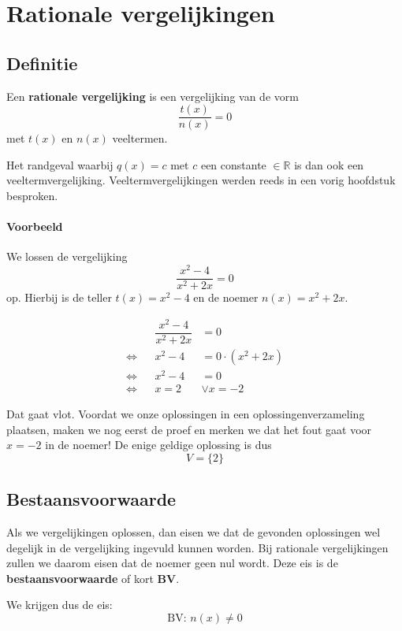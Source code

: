 \documentclass[a4paper,12pt]{article}
\begin{document}
\section{Rationale vergelijkingen}

\subsection{Definitie}

\begin{mdframed}
Een {\bf rationale vergelijking} is een vergelijking van de vorm
$$\dfrac{t(x)}{n(x)}=0$$
met $t(x)$ en $n(x)$ veeltermen.
\end{mdframed}

Het randgeval waarbij $q(x)=c$ met $c$ een constante $\in \mathbb{R}$ is dan ook een veeltermvergelijking. Veeltermvergelijkingen werden reeds in een vorig hoofdstuk besproken.

\paragraph{Voorbeeld}

We lossen de vergelijking
$$\dfrac{x^2-4}{x^2+2x}=0$$
op. Hierbij is de teller $t(x)=x^2-4$ en de noemer $n(x)=x^2+2x$.

\begin{align*}
  && \dfrac{x^2-4}{x^2+2x} &= 0\\
  \Leftrightarrow &&              x^2-4 &= 0 \cdot (x^2+2x) \\
  \Leftrightarrow &&              x^2-4 &= 0\\
  \Leftrightarrow &&              x = 2 &\vee x = -2
\end{align*}

Dat gaat vlot. Voordat we onze oplossingen in een oplossingenverzameling plaatsen, maken we nog eerst de proef en merken we dat het fout gaat voor $x=-2$ in de noemer! De enige geldige oplossing is dus
$$V=\{2\}$$

\subsection{Bestaansvoorwaarde}
Als we vergelijkingen oplossen, dan eisen we dat de gevonden oplossingen wel degelijk in de vergelijking ingevuld kunnen worden. Bij rationale vergelijkingen zullen we daarom eisen dat de noemer geen nul wordt. Deze eis is de {\bf bestaansvoorwaarde} of kort {\bf BV}.

We krijgen dus de eis:
$$ \text{BV: } n(x) \neq 0 $$
\end{document}
